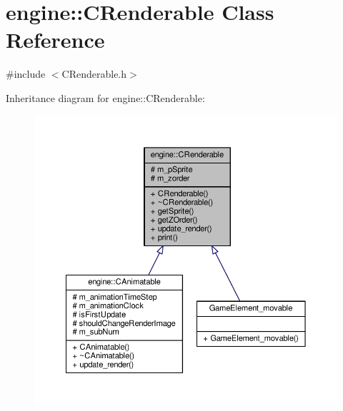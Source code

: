 \hypertarget{classengine_1_1CRenderable}{\section{engine\-:\-:C\-Renderable Class Reference}
\label{classengine_1_1CRenderable}
}


{\ttfamily \#include $<$C\-Renderable.\-h$>$}



Inheritance diagram for engine\-:\-:C\-Renderable\-:
\nopagebreak
\begin{figure}[H]
\begin{center}
\leavevmode
\includegraphics[width=350pt]{classengine_1_1CRenderable__inherit__graph}
\end{center}
\end{figure}


